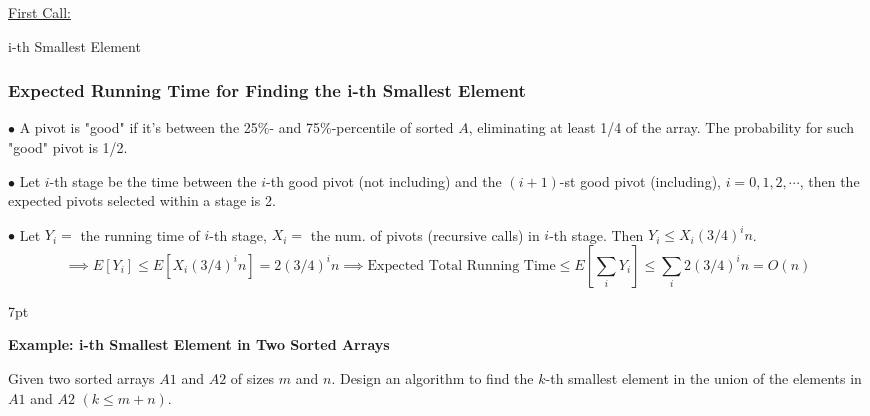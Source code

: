 \documentclass[10pt]{article}
\newenvironment{formal}[2]{%
	\def\FrameCommand{%
		\hspace{1pt}%
		{\color{#1}\vrule width 2pt}%
		{\color{#2}\vrule width 4pt}%
		\colorbox{#2}%
	}%
	\MakeFramed{\advance\hsize-\width\FrameRestore}%
	\noindent\hspace{-4.55pt}%
	\begin{adjustwidth}{}{7pt}%
		\vspace{2pt}\vspace{2pt}%
	}
	{%
		\vspace{2pt}\end{adjustwidth}\endMakeFramed%
}
\begin{document}
\begin{algorithm}
	\SetAlgoLined
	
	\underline{First Call:} 
	
	\caption{i-th Smallest Element}
\end{algorithm}

\subsubsection{Expected Running Time for Finding the i-th Smallest Element}

$\bullet$ A pivot is "good" if it's between the 25\%- and 75\%-percentile of sorted $A$, eliminating at least 1/4 of the array. The probability for such "good" pivot is 1/2.

$\bullet$ Let $i$-th stage be the time between the $i$-th good pivot (not including) and the $(i+1)$-st good pivot (including), $i=0, 1, 2, \cdots$, then the expected pivots selected within a stage is 2.

$\bullet$ Let $Y_i =$ the running time of $i$-th stage, $X_i =$ the num. of pivots (recursive calls) in $i$-th stage. Then $Y_i \leq X_i (3/4)^i n$.
$$
\implies E[Y_i] \leq E[X_i (3/4)^i n] = 2(3/4)^i n \implies \text{Expected Total Running Time} \leq E[\sum_i Y_i] \leq \sum_i 2(3/4)^i n = O(n)
$$

\begin{formal}{Brown}{brownshade}
	
	\textbf{Example: i-th Smallest Element in Two Sorted Arrays}
	
	Given two sorted arrays $A1$ and $A2$ of sizes $m$ and $n$. Design an
	algorithm to find the $k$-th smallest element in the union of the elements in $A1$ and $A2$ $(k \leq m+n)$.
	
\end{formal}
\end{document}
